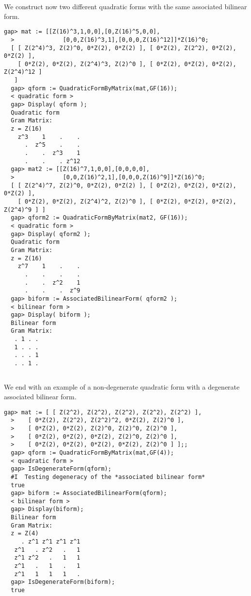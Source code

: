 \documentclass[a4paper,11pt]{report}
\begin{document}
{{{\begin{Verbatim}[fontsize=\small,frame=single,label=Example]
\end{Verbatim}
 We construct now two different quadratic forms with the same associated
bilinear form. 
\begin{Verbatim}[fontsize=\small,frame=single,label=Example]
  gap> mat := [[Z(16)^3,1,0,0],[0,Z(16)^5,0,0],
  >              [0,0,Z(16)^3,1],[0,0,0,Z(16)^12]]*Z(16)^0;
  [ [ Z(2^4)^3, Z(2)^0, 0*Z(2), 0*Z(2) ], [ 0*Z(2), Z(2^2), 0*Z(2), 0*Z(2) ], 
    [ 0*Z(2), 0*Z(2), Z(2^4)^3, Z(2)^0 ], [ 0*Z(2), 0*Z(2), 0*Z(2), Z(2^4)^12 ] 
   ]
  gap> qform := QuadraticFormByMatrix(mat,GF(16));
  < quadratic form >
  gap> Display( qform );
  Quadratic form
  Gram Matrix:
  z = Z(16)
    z^3    1    .    .
      .  z^5    .    .
      .    .  z^3    1
      .    .    . z^12
  gap> mat2 := [[Z(16)^7,1,0,0],[0,0,0,0],
  >              [0,0,Z(16)^2,1],[0,0,0,Z(16)^9]]*Z(16)^0;
  [ [ Z(2^4)^7, Z(2)^0, 0*Z(2), 0*Z(2) ], [ 0*Z(2), 0*Z(2), 0*Z(2), 0*Z(2) ], 
    [ 0*Z(2), 0*Z(2), Z(2^4)^2, Z(2)^0 ], [ 0*Z(2), 0*Z(2), 0*Z(2), Z(2^4)^9 ] ]
  gap> qform2 := QuadraticFormByMatrix(mat2, GF(16));
  < quadratic form >
  gap> Display( qform2 );
  Quadratic form
  Gram Matrix:
  z = Z(16)
    z^7    1    .    .
      .    .    .    .
      .    .  z^2    1
      .    .    .  z^9
  gap> biform := AssociatedBilinearForm( qform2 );
  < bilinear form >
  gap> Display( biform );
  Bilinear form
  Gram Matrix:
   . 1 . .
   1 . . .
   . . . 1
   . . 1 .
   
\end{Verbatim}
 We end with an example of a non-degenerate quadratic form with a degenerate
associated bilinear form. 
\begin{Verbatim}[fontsize=\small,frame=single,label=Example]
  gap> mat := [ [ Z(2^2), Z(2^2), Z(2^2), Z(2^2), Z(2^2) ], 
  >    [ 0*Z(2), Z(2^2), Z(2^2)^2, 0*Z(2), Z(2)^0 ], 
  >    [ 0*Z(2), 0*Z(2), Z(2)^0, Z(2)^0, Z(2)^0 ], 
  >    [ 0*Z(2), 0*Z(2), 0*Z(2), Z(2)^0, Z(2)^0 ], 
  >    [ 0*Z(2), 0*Z(2), 0*Z(2), 0*Z(2), Z(2)^0 ] ];;
  gap> qform := QuadraticFormByMatrix(mat,GF(4));
  < quadratic form >
  gap> IsDegenerateForm(qform);
  #I  Testing degeneracy of the *associated bilinear form*
  true
  gap> biform := AssociatedBilinearForm(qform);
  < bilinear form >
  gap> Display(biform);
  Bilinear form
  Gram Matrix:
  z = Z(4)
     . z^1 z^1 z^1 z^1
   z^1   . z^2   .   1
   z^1 z^2   .   1   1
   z^1   .   1   .   1
   z^1   1   1   1   .
  gap> IsDegenerateForm(biform);
  true
   
\end{Verbatim}
 }

 }

 }
\end{document}
